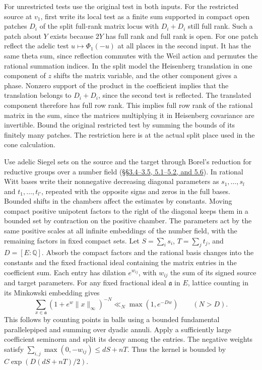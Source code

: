 For unrestricted tests use the original test in both inputs. For
the restricted source at \(v_1\), first write its local test as a
finite sum supported in compact open patches \(D_i\) of the split
full-rank matrix locus with \(D_i+D_i\) still full rank. Such a
patch about \(Y\) exists because \(2Y\) has full rank and full rank
is open. For one patch reflect the adelic test \(u\mapsto\Phi_1(-u)\) at all places
in the second input. It has the same theta sum, since reflection
commutes with the Weil action and permutes the rational summation
indices. In the split model the Heisenberg translation in one
component of \(z\) shifts the matrix variable, and the other component
gives a phase. Nonzero support of the product in the coefficient
implies that the translation belongs to \(D_i+D_i\), since the
second test is reflected. The translated component therefore has
full row rank. This implies full row rank of the rational matrix
in the sum, since the matrices multiplying it in Heisenberg
covariance are invertible. Bound the original restricted test by
summing the bounds of its finitely many patches. The restriction
here is at the actual split place used in the cone calculation.

Use adelic Siegel sets on the source and the target through
Borel's reduction for reductive groups over a number field
(\href{https://www.numdam.org/item/PMIHES_1963__16__5_0.pdf}{\S\S3.4--3.5,
 5.1--5.2, and 5.6}).
In rational
Witt bases write their nonnegative decreasing diagonal parameters
as \(s_1,\dots,s_l\) and \(t_1,\dots,t_{l'}\), repeated with
the opposite signs and zeros in the full bases. Bounded shifts in
the chambers affect the estimates by constants. Moving compact
positive unipotent factors to the right of the diagonal keeps them
in a bounded set by contraction on the positive chamber.
The parameters
act by the same positive scales at all infinite embeddings of
the number field, with the remaining factors in fixed compact
sets. Let \(S=\sum_i s_i\), \(T=\sum_j t_j\), and \(D=[E:\mathbb Q]\).
Absorb the compact factors and the rational basis changes into
the constants and the fixed fractional ideal containing the
matrix entries in the coefficient sum. Each entry has dilation
\(e^{w_{ij}}\), with \(w_{ij}\) the sum of its signed source and
target parameters. For any fixed fractional ideal \(\mathfrak a\)
in \(E\), lattice counting in its Minkowski embedding gives
\[
 \sum_{x\in\mathfrak a}(1+e^w\|x\|_\infty)^{-N}
        \ll_N \max(1,e^{-Dw}) \qquad (N>D).
\]
This follows by counting points in balls using a bounded fundamental
parallelepiped and summing over dyadic annuli. Apply a sufficiently
large coefficient seminorm and split its decay among the entries.
The negative weights satisfy
\(\sum_{i,j}\max(0,-w_{ij})\le dS+nT\).
Thus the kernel is bounded by \(C\exp(D(dS+nT)/2)\).

